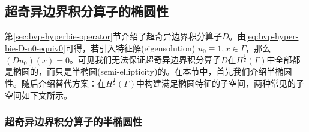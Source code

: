 \subsection{超奇异边界积分算子的椭圆性}
\label{sec:bvp-bie-hyper-ellipticity}

第\ref{sec:bvp-hyperbie-operator}节介绍了超奇异边界积分算子$D$。由\eqref{eq:bvp-hyper-bie-D-u0-equiv0}可得，若引入特征解(eigensolution) $u_{0} \equiv 1, x \in \Gamma$，那么$\left( D u_{0}  \right) (x) = 0$。可见我们无法保证超奇异边界积分算子$D$在$H^{\frac{1}{2}}(\Gamma)$中全部都是椭圆的，而只是半椭圆(semi-ellipticity)的。在本节中，首先我们介绍半椭圆性。随后介绍替代方案：在$H^{\frac{1}{2}}(\Gamma)$中构建满足椭圆特征的子空间，两种常见的子空间如下文所示。

\subsubsection{超奇异边界积分算子的半椭圆性}
\label{sec:bvp-bie-hyper-semi-ellipticity}

